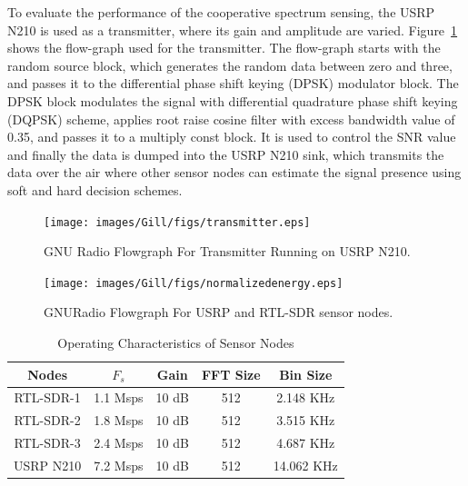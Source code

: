 To evaluate the performance of the cooperative spectrum sensing, the USRP N210 is used as a transmitter, where its gain and amplitude are varied. Figure~\ref{transmitter} shows the flow-graph used for the transmitter. The flow-graph starts with the random source block, which generates the random data between zero and three, and passes it to the differential phase shift keying (DPSK) modulator block. The DPSK block modulates the signal with differential quadrature phase shift keying (DQPSK) scheme, applies root raise cosine filter with excess bandwidth value of 0.35, and passes it to a multiply const block. It is used to control the SNR value and finally the data is dumped into the USRP N210 sink, which transmits the data over the air where other sensor nodes can estimate the signal presence using soft and hard decision schemes.

\begin{figure}[ht!]
	\centering
	\texttt{[image: images/Gill/figs/transmitter.eps]}
    \caption{GNU Radio Flowgraph For Transmitter Running on USRP N210.} 
\label{transmitter}      
\end{figure}

\begin{figure}[ht!]
	\centering
	\texttt{[image: images/Gill/figs/normalizedenergy.eps]}
    \caption{GNURadio Flowgraph For USRP and RTL-SDR sensor nodes.} 
\label{receiver}      
\end{figure}

\begin{table}[!ht]
\caption{Operating Characteristics of Sensor Nodes}
\centering
\vspace{-5pt}
\begin{tabular}{c c c c c}
\toprule
Nodes      & $F_s$     & Gain  & FFT Size &  Bin Size \\ \hline
RTL-SDR-1  & 1.1 Msps  & 10 dB & 512      & 2.148 KHz \\ \hline
RTL-SDR-2  & 1.8 Msps  & 10 dB & 512      & 3.515 KHz\\ \hline
RTL-SDR-3  & 2.4 Msps  & 10 dB & 512      & 4.687 KHz\\ \hline
USRP N210  & 7.2 Msps  & 10 dB & 512     &  14.062 KHz\\ 
\bottomrule
\end{tabular}
\vspace{-5pt}
\label{tablehet}
\end{table}

